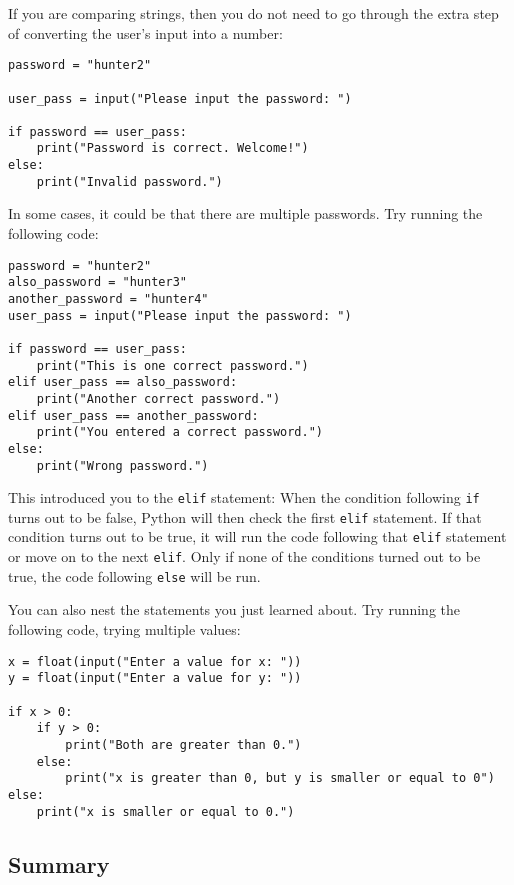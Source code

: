 \documentclass[11pt,hidelinks]{article}
\begin{document}
If you are comparing strings, then you do not need to go through the extra step
of converting the user's input into a number:

\begin{lstlisting}[style=python]
password = "hunter2"

user_pass = input("Please input the password: ")

if password == user_pass:
    print("Password is correct. Welcome!")
else:
    print("Invalid password.")
\end{lstlisting}

In some cases, it could be that there are multiple passwords. Try running the
following code:
\begin{lstlisting}
password = "hunter2"
also_password = "hunter3"
another_password = "hunter4"
user_pass = input("Please input the password: ")

if password == user_pass:
    print("This is one correct password.")
elif user_pass == also_password:
    print("Another correct password.")
elif user_pass == another_password:
    print("You entered a correct password.")
else:
    print("Wrong password.")
\end{lstlisting}

This introduced you to the \lstinline!elif! statement: When the condition
following \lstinline!if! turns out to be false, Python will then check the first
\lstinline!elif! statement. If that condition turns out to be true, it will run
the code following that \lstinline!elif! statement or move on to the next
\lstinline!elif!. Only if none of the conditions turned out to be true, the code
following \lstinline!else! will be run.

You can also nest the statements you just learned about. Try running the
following code, trying multiple values:
\begin{lstlisting}
x = float(input("Enter a value for x: "))
y = float(input("Enter a value for y: "))

if x > 0:
    if y > 0:
        print("Both are greater than 0.")
    else:
        print("x is greater than 0, but y is smaller or equal to 0")
else:
    print("x is smaller or equal to 0.")
\end{lstlisting}

\subsection{Summary}
\end{document}
